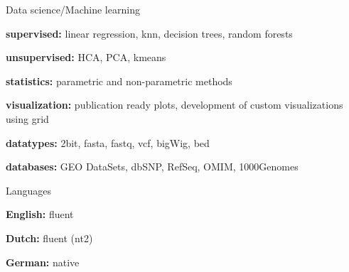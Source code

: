 \begin{cvskills}
  \cvskill
    {Data science/Machine learning}%
    {
      \begin{cvitems}
        \item {\textbf{supervised:} linear regression, knn, decision trees, random forests}
        \item {\textbf{unsupervised:} HCA, PCA, kmeans}
        \item {\textbf{statistics:} parametric and non-parametric methods}
        \item {\textbf{visualization:} publication ready plots, development of custom visualizations using grid}
        \item {\textbf{datatypes:} 2bit, fasta, fastq, vcf, bigWig, bed}
        \item {\textbf{databases:} GEO DataSets, dbSNP, RefSeq, OMIM, 1000Genomes}
      \end{cvitems}
    }
  \cvskill
    {Languages} %
    {
      \begin{cvitems}
        \item {\textbf{English:} fluent}
        \item {\textbf{Dutch:} fluent (nt2)}
        \item {\textbf{German:} native}
      \end{cvitems}
    }
\end{cvskills}
